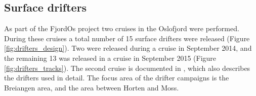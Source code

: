 \subsection{Surface drifters}
\label{subsec:drifto}
As part of the FjordOs project two cruises in the Oslofjord were performed. During these cruises a total number of 15 surface drifters were released (Figure \ref{fig:drifters_design}). Two were released during a cruise in September 2014, and the remaining 13 was released in a cruise in September 2015 (Figure \ref{fig:drifters_tracks}). The second cruise is documented in \cite{hjelm:etal:2016}, which also describes the drifters used in detail. The focus area of the drifter campaigns is the Breiangen area, and the area between Horten and Moss.

